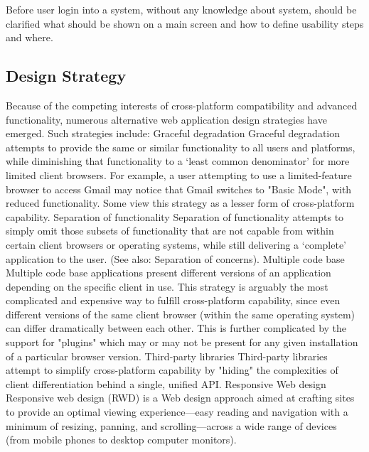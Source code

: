 Before user login into a system, without any knowledge about system, should be clarified what should be shown on a main screen and how to define usability steps and where. 

\subsection {Design Strategy}
Because of the competing interests of cross-platform compatibility and advanced functionality, numerous alternative web application design strategies have emerged. Such strategies include:
\newline
Graceful degradation
\newline
Graceful degradation attempts to provide the same or similar functionality to all users and platforms, while diminishing that functionality to a ‘least common denominator’ for more limited client browsers. For example, a user attempting to use a limited-feature browser to access Gmail may notice that Gmail switches to "Basic Mode", with reduced functionality. Some view this strategy as a lesser form of cross-platform capability.
\newline
Separation of functionality
\newline
Separation of functionality attempts to simply omit those subsets of functionality that are not capable from within certain client browsers or operating systems, while still delivering a ‘complete’ application to the user. (See also: Separation of concerns).
\newline
Multiple code base
\newline
Multiple code base applications present different versions of an application depending on the specific client in use. This strategy is arguably the most complicated and expensive way to fulfill cross-platform capability, since even different versions of the same client browser (within the same operating system) can differ dramatically between each other. This is further complicated by the support for "plugins" which may or may not be present for any given installation of a particular browser version.
\newline
Third-party libraries
\newline
Third-party libraries attempt to simplify cross-platform capability by "hiding" the complexities of client differentiation behind a single, unified API.
\newline
Responsive Web design
\newline
Responsive web design (RWD) is a Web design approach aimed at crafting sites to provide an optimal viewing experience—easy reading and navigation with a minimum of resizing, panning, and scrolling—across a wide range of devices (from mobile phones to desktop computer monitors).

